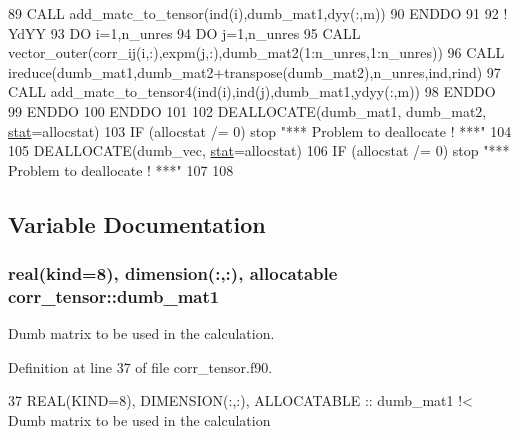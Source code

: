 \begin{DoxyCode}
89           \textcolor{keyword}{CALL }add\_matc\_to\_tensor(ind(i),dumb\_mat1,dyy(:,m))
90 \textcolor{keywordflow}{       ENDDO}
91 
92        \textcolor{comment}{! YdYY}
93        \textcolor{keywordflow}{DO} i=1,n\_unres
94           \textcolor{keywordflow}{DO} j=1,n\_unres
95              \textcolor{keyword}{CALL }vector\_outer(corr\_ij(i,:),expm(j,:),dumb\_mat2(1:n\_unres,1:n\_unres))
96              \textcolor{keyword}{CALL }ireduce(dumb\_mat1,dumb\_mat2+transpose(dumb\_mat2),n\_unres,ind,rind)
97              \textcolor{keyword}{CALL }add\_matc\_to\_tensor4(ind(i),ind(j),dumb\_mat1,ydyy(:,m))
98 \textcolor{keywordflow}{          ENDDO}
99 \textcolor{keywordflow}{       ENDDO}
100 \textcolor{keywordflow}{    ENDDO}
101 
102     \textcolor{keyword}{DEALLOCATE}(dumb\_mat1, dumb\_mat2, \hyperlink{namespacestat}{stat}=allocstat)
103     \textcolor{keywordflow}{IF} (allocstat /= 0)  stop \textcolor{stringliteral}{"*** Problem to deallocate ! ***"}
104 
105     \textcolor{keyword}{DEALLOCATE}(dumb\_vec, \hyperlink{namespacestat}{stat}=allocstat)
106     \textcolor{keywordflow}{IF} (allocstat /= 0)  stop \textcolor{stringliteral}{"*** Problem to deallocate ! ***"}
107 
108 
\end{DoxyCode}


\subsection{Variable Documentation}
\subsubsection[{\texorpdfstring{dumb\+\_\+mat1}{dumb_mat1}}]{\setlength{\rightskip}{0pt plus 5cm}real(kind=8), dimension(\+:,\+:), allocatable corr\+\_\+tensor\+::dumb\+\_\+mat1\hspace{0.3cm}{\ttfamily [private]}}\hypertarget{namespacecorr__tensor_aa0f6f11b738412d93dbd832a961d6e78}{}\label{namespacecorr__tensor_aa0f6f11b738412d93dbd832a961d6e78}


Dumb matrix to be used in the calculation. 



Definition at line 37 of file corr\+\_\+tensor.\+f90.


\begin{DoxyCode}
37   \textcolor{keywordtype}{REAL(KIND=8)}, \textcolor{keywordtype}{DIMENSION(:,:)}, \textcolor{keywordtype}{ALLOCATABLE} :: dumb\_mat1\textcolor{comment}{ !< Dumb matrix to be used in the calculation}
\end{DoxyCode}
